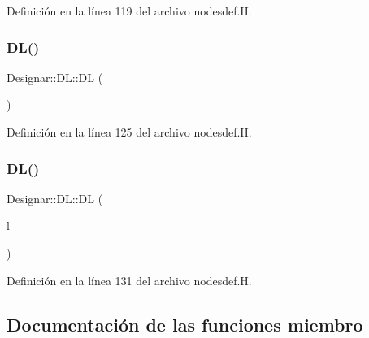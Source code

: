 Definición en la línea 119 del archivo nodesdef.\+H.

\mbox{\label{class_designar_1_1_d_l_a4caafdd81bc08bdb7d42cbcbe735f59f}} 
\subsubsection{\texorpdfstring{D\+L()}{DL()}\hspace{0.1cm}{\footnotesize\ttfamily [2/3]}}
{\footnotesize\ttfamily Designar\+::\+D\+L\+::\+DL (\begin{DoxyParamCaption}\item[{const \hyperlink{class_designar_1_1_d_l}{DL} \&}]{ }\end{DoxyParamCaption})\hspace{0.3cm}{\ttfamily [inline]}}



Definición en la línea 125 del archivo nodesdef.\+H.

\mbox{\label{class_designar_1_1_d_l_a4a9a38fbd77259a4af54dcd5017fce76}} 
\subsubsection{\texorpdfstring{D\+L()}{DL()}\hspace{0.1cm}{\footnotesize\ttfamily [3/3]}}
{\footnotesize\ttfamily Designar\+::\+D\+L\+::\+DL (\begin{DoxyParamCaption}\item[{\hyperlink{class_designar_1_1_d_l}{DL} \&\&}]{l }\end{DoxyParamCaption})\hspace{0.3cm}{\ttfamily [inline]}}



Definición en la línea 131 del archivo nodesdef.\+H.



\subsection{Documentación de las funciones miembro}
\mbox{\label{class_designar_1_1_d_l_a016ee38fa1d6a467f07b3c8838e14937}} 
